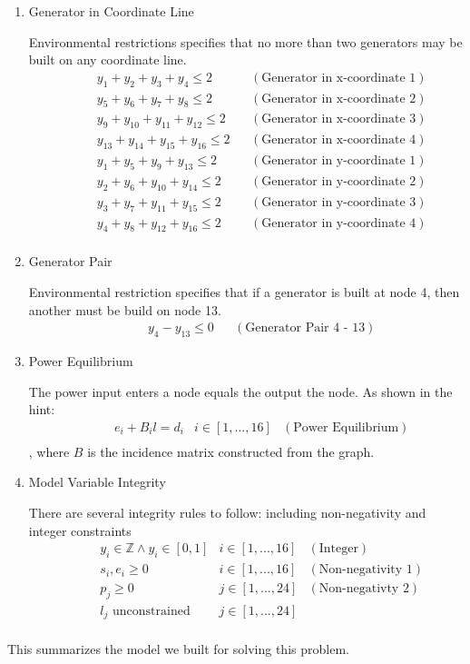\begin{enumerate}
\item Generator in Coordinate Line \par
Environmental restrictions specifies that no more than two generators may be built on any coordinate line.
\begin{align*}
&&& y_1 + y_2 + y_3 + y_4 \leq 2 && (\text{Generator in x-coordinate 1}) \\
&&& y_5 + y_6 + y_7 + y_8 \leq 2 && (\text{Generator in x-coordinate 2}) \\
&&& y_9 + y_{10} + y_{11} + y_{12} \leq 2 && (\text{Generator in x-coordinate 3}) \\
&&& y_{13} + y_{14} + y_{15} + y_{16} \leq 2 && (\text{Generator in x-coordinate 4}) \\
&&& y_1 + y_5 + y_9 + y_{13} \leq 2 && (\text{Generator in y-coordinate 1}) \\
&&& y_2 + y_6 + y_{10} + y_{14} \leq 2 && (\text{Generator in y-coordinate 2}) \\
&&& y_3 + y_{7} + y_{11} + y_{15} \leq 2 && (\text{Generator in y-coordinate 3}) \\
&&& y_{4} + y_{8} + y_{12} + y_{16} \leq 2 && (\text{Generator in y-coordinate 4}) \\
\end{align*}

\item Generator Pair \par
Environmental restriction specifies that if a generator is built at node 4, then another must be build on node 13. 
\begin{align*}
&&& y_4- y_{13} \leq 0 & &(\text{Generator Pair 4 - 13})
\end{align*}

\item Power Equilibrium \par
The power input enters a node equals the output the node. 
As shown in the hint:
\begin{align*}
&&& e_i + B_i l = d_i & i \in [1,...,16] & (\text{Power Equilibrium}) \\
\end{align*}
, where $B$ is the incidence matrix constructed from the graph. 


\item Model Variable Integrity \par
There are several integrity rules to follow: including non-negativity and integer constraints
\begin{align*}
&&& y_i \in \mathbb{Z} \land y_i \in [0, 1] & i \in [1,...,16] & (\text{Integer}) \\
&&& s_i, e_i \geq 0 & i \in [1,...,16] & (\text{Non-negativity 1}) \\
&&& p_j \geq 0 & j \in [1,...,24] & (\text{Non-negativty 2}) \\
&&& l_j \text{ unconstrained} &  j \in [1,...,24] & \\
\end{align*}
\end{enumerate}
This summarizes the model we built for solving this problem.


